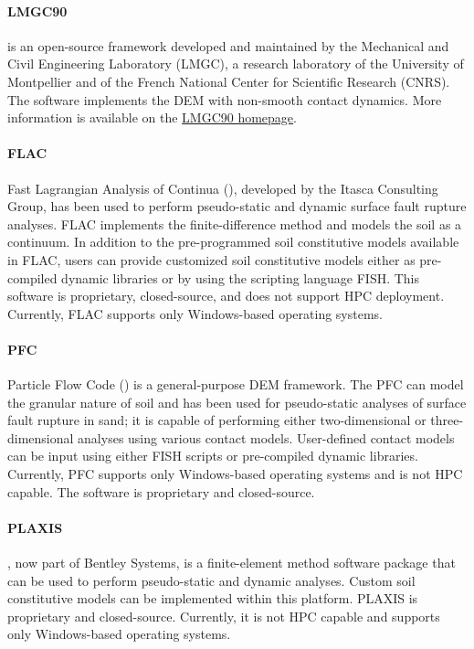 \paragraph{LMGC90}
 is an open-source framework developed and maintained by the Mechanical and Civil Engineering Laboratory (LMGC), a research laboratory of the University of Montpellier and of the French National Center for Scientific Research (CNRS). The software implements the DEM with non-smooth contact dynamics. More information is available on the \href{http://mimetics-engineering.fr/index.php/en/lmgc90-2/}{LMGC90 homepage}.

\paragraph{FLAC}
Fast Lagrangian Analysis of Continua (), developed by the Itasca Consulting Group, has been used to perform pseudo-static and dynamic surface fault rupture analyses. FLAC implements the finite-difference method and models the soil as a continuum. In addition to the pre-programmed soil constitutive models available in FLAC, users can provide customized soil constitutive models either as pre-compiled dynamic libraries or by using the scripting language FISH. This software is proprietary, closed-source, and does not support HPC deployment. Currently, FLAC supports only Windows-based operating systems.

\paragraph{PFC}
Particle Flow Code () is a general-purpose DEM framework. The PFC can model the granular nature of soil and has been used for pseudo-static analyses of surface fault rupture in sand; it is capable of performing either two-dimensional or three-dimensional analyses using various contact models. User-defined contact models can be input using either FISH scripts or pre-compiled dynamic libraries. Currently, PFC supports only Windows-based operating systems and is not HPC capable. The software is proprietary and closed-source.

\paragraph{PLAXIS}
, now part of Bentley Systems, is a finite-element method software package that can be used to perform pseudo-static and dynamic analyses. Custom soil constitutive models can be implemented within this platform. PLAXIS is proprietary and closed-source. Currently, it is not HPC capable and supports only Windows-based operating systems.


